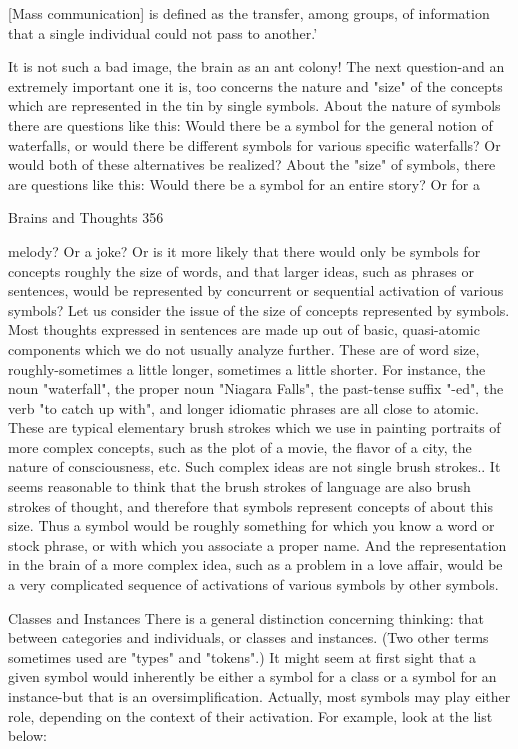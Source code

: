  [Mass communication] is defined as the transfer, among groups, of information that a
 single individual could not pass to another.'

It is not such a bad image, the brain as an ant colony!
       The next question-and an extremely important one it is, too concerns the
nature and "size" of the concepts which are represented in the tin by single
symbols. About the nature of symbols there are questions like this: Would there be
a symbol for the general notion of waterfalls, or would there be different symbols
for various specific waterfalls? Or would both of these alternatives be realized?
About the "size" of symbols, there are questions like this: Would there be a symbol
for an entire story? Or for a




Brains and Thoughts                                                                     356

melody? Or a joke? Or is it more likely that there would only be symbols for concepts
roughly the size of words, and that larger ideas, such as phrases or sentences, would be
represented by concurrent or sequential activation of various symbols?
  Let us consider the issue of the size of concepts represented by symbols. Most thoughts
expressed in sentences are made up out of basic, quasi-atomic components which we do
not usually analyze further. These are of word size, roughly-sometimes a little longer,
sometimes a little shorter. For instance, the noun "waterfall", the proper noun "Niagara
Falls", the past-tense suffix "-ed", the verb "to catch up with", and longer idiomatic
phrases are all close to atomic. These are typical elementary brush strokes which we use
in painting portraits of more complex concepts, such as the plot of a movie, the flavor of
a city, the nature of consciousness, etc. Such complex ideas are not single brush strokes..
It seems reasonable to think that the brush strokes of language are also brush strokes of
thought, and therefore that symbols represent concepts of about this size. Thus a symbol
would be roughly something for which you know a word or stock phrase, or with which
you associate a proper name. And the representation in the brain of a more complex idea,
such as a problem in a love affair, would be a very complicated sequence of activations
of various symbols by other symbols.

                                  Classes and Instances
  There is a general distinction concerning thinking: that between categories and
individuals, or classes and instances. (Two other terms sometimes used are "types" and
"tokens".) It might seem at first sight that a given symbol would inherently be either a
symbol for a class or a symbol for an instance-but that is an oversimplification. Actually,
most symbols may play either role, depending on the context of their activation. For
example, look at the list below:


